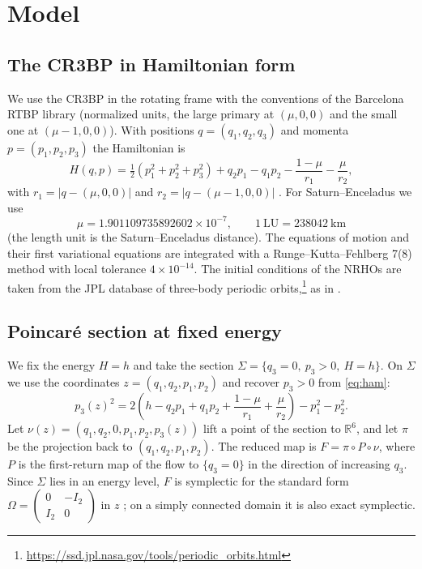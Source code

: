 \documentclass[11pt]{article}
\newcommand{\R}{\mathbb{R}}
\begin{document}
\section{Model}\label{sec:model}

\subsection{The CR3BP in Hamiltonian form}
We use the CR3BP in the rotating frame with the conventions of the Barcelona RTBP library
(normalized units, the large primary at $(\mu,0,0)$ and the small one at $(\mu-1,0,0)$). With
positions $q=(q_1,q_2,q_3)$ and momenta $p=(p_1,p_2,p_3)$ the Hamiltonian is
\begin{equation}\label{eq:ham}
H(q,p) = \tfrac12\left(p_1^2+p_2^2+p_3^2\right) + q_2 p_1 - q_1 p_2 - \frac{1-\mu}{r_1} - \frac{\mu}{r_2},
\end{equation}
with $r_1 = |q-(\mu,0,0)|$ and $r_2 = |q-(\mu-1,0,0)|$ \cite{szebehely1967,koon2011}. For
Saturn--Enceladus we use
\[
\mu = 1.901109735892602\times10^{-7}, \qquad 1~\mathrm{LU} = 238042~\mathrm{km}
\]
(the length unit is the Saturn--Enceladus distance). The equations of motion and their
first variational equations are integrated with a Runge--Kutta--Fehlberg 7(8) method
\cite{fehlberg1968rk78} with local tolerance $4\times10^{-14}$.
The initial conditions of the NRHOs are taken from the JPL database of three-body periodic
orbits,\footnote{\url{https://ssd.jpl.nasa.gov/tools/periodic_orbits.html}} as in
\cite{blanchard2024thesis}.

\subsection{Poincar\'e section at fixed energy}
We fix the energy $H=h$ and take the section $\Sigma = \{q_3 = 0,\ p_3>0,\ H=h\}$. On $\Sigma$ we
use the coordinates $z=(q_1,q_2,p_1,p_2)$ and recover $p_3>0$ from \eqref{eq:ham}:
\begin{equation}\label{eq:p3}
p_3(z)^2 = 2\left(h - q_2 p_1 + q_1 p_2 + \frac{1-\mu}{r_1} + \frac{\mu}{r_2}\right) - p_1^2 - p_2^2 .
\end{equation}
Let $\nu(z) = (q_1,q_2,0,p_1,p_2,p_3(z))$ lift a point of the section to $\R^6$, and let $\pi$ be
the projection back to $(q_1,q_2,p_1,p_2)$. The reduced map is $F = \pi\circ P\circ\nu$, where
$P$ is the first-return map of the flow to $\{q_3=0\}$ in the direction of increasing $q_3$. Since
$\Sigma$ lies in an energy level, $F$ is symplectic for the standard form
$\Omega = \left(\begin{smallmatrix} 0 & -I_2\\ I_2 & 0\end{smallmatrix}\right)$ in $z$ \cite[Remark~2.4.5, p.~8]{haromondelo2021flow}; on a simply connected domain it
is also exact symplectic.
\end{document}
